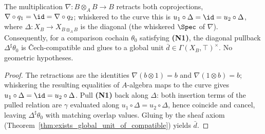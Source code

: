 \begin{theorem}
  \label{thm:exists_glued_diagonalSeed}
  \leanok
  The multiplication \(\nabla \colon B \otimes_A B \to B\) retracts both coprojections, \(\nabla
  \circ q_1 = \id = \nabla \circ q_2\); whiskered to the curve this is \(u_1 \circ \Delta = \id =
  u_2 \circ \Delta\), where \(\Delta \colon X_B \to X_{B \otimes_A B}\) is the diagonal (the
  whiskered \(\Spec\) of \(\nabla\)). Consequently, for a comparison cochain \(\theta_0\) satisfying
  \textbf{(N1)}, the diagonal pullback \(\Delta^{\sharp}\theta_0\) is \v Cech-compatible and glues to
  a global unit \(\bar d \in \Gamma(X_B, \top)^{\times}\). No geometric hypotheses.
\end{theorem}
\begin{proof}
  \leanok
  The retractions are the identities \(\nabla(b \otimes 1) = b\) and \(\nabla(1 \otimes b) = b\);
  whiskering the resulting equalities of \(A\)-algebra maps to the curve gives \(u_1 \circ \Delta =
  \id = u_2 \circ \Delta\). Pull \textbf{(N1)} back along \(\Delta\): both insertion terms of the
  pulled relation are \(\gamma\) evaluated along \(u_1 \circ \Delta = u_2 \circ \Delta\), hence
  coincide and cancel, leaving \(\Delta^{\sharp}\theta_0\) with matching overlap values. Gluing by
  the sheaf axiom (Theorem~\ref{thm:exists_global_unit_of_compatible}) yields \(\bar d\).
\end{proof}

